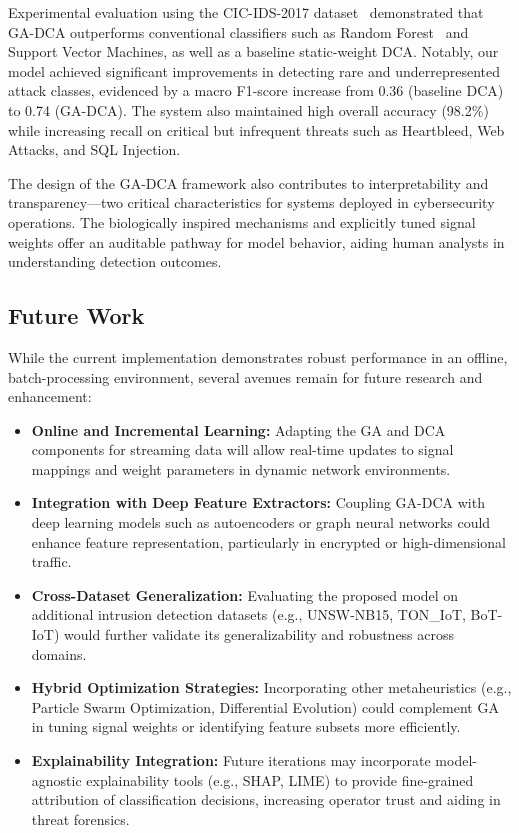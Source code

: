 \documentclass[conference]{IEEEtran}
\begin{document}
Experimental evaluation using the CIC-IDS-2017
dataset~\cite{sharafaldin_toward_2018} demonstrated
that GA-DCA outperforms conventional classifiers such as Random
Forest~\cite{breiman_random_2001} and Support Vector Machines, as
well as a baseline
static-weight DCA. Notably, our model achieved significant
improvements in detecting rare and underrepresented attack classes,
evidenced by a macro F1-score increase from 0.36 (baseline DCA) to
0.74 (GA-DCA). The system also maintained high overall accuracy
(98.2\%) while increasing recall on critical but infrequent threats
such as Heartbleed, Web Attacks, and SQL Injection.

The design of the GA-DCA framework also contributes to
interpretability and transparency—two critical characteristics for
systems deployed in cybersecurity operations. The biologically
inspired mechanisms and explicitly tuned signal weights offer an
auditable pathway for model behavior, aiding human analysts in
understanding detection outcomes.

\subsection*{Future Work}

While the current implementation demonstrates robust performance in
an offline, batch-processing environment, several avenues remain for
future research and enhancement:

\begin{itemize}
  \item \textbf{Online and Incremental Learning:} Adapting the GA and
    DCA components for streaming data will allow real-time updates to
    signal mappings and weight parameters in dynamic network environments.

  \item \textbf{Integration with Deep Feature Extractors:} Coupling
    GA-DCA with deep learning models such as autoencoders or graph
    neural networks could enhance feature representation,
    particularly in encrypted or high-dimensional traffic.

  \item \textbf{Cross-Dataset Generalization:} Evaluating the
    proposed model on additional intrusion detection datasets (e.g.,
    UNSW-NB15, TON\_IoT, BoT-IoT) would further validate its
    generalizability and robustness across domains.

  \item \textbf{Hybrid Optimization Strategies:} Incorporating other
    metaheuristics (e.g., Particle Swarm Optimization, Differential
    Evolution) could complement GA in tuning signal weights or
    identifying feature subsets more efficiently.

  \item \textbf{Explainability Integration:} Future iterations may
    incorporate model-agnostic explainability tools (e.g., SHAP,
    LIME) to provide fine-grained attribution of classification
    decisions, increasing operator trust and aiding in threat forensics.
\end{itemize}
\end{document}
